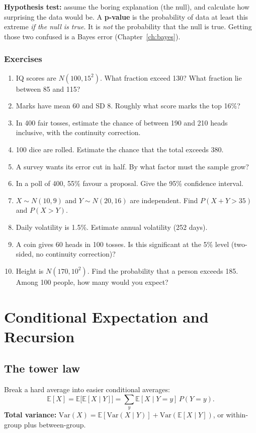 \documentclass[11pt,a4paper,openany]{report}
\newenvironment{exercises}{\subsection*{Exercises \thechapter}\begin{enumerate}[label=\textbf{\thechapter.\arabic*},leftmargin=3.2em]}{\end{enumerate}}
\newcommand{\E}{\mathbb{E}}
\begin{document}
\textbf{Hypothesis test:} assume the boring explanation (the null), and calculate how surprising the data would be. A \textbf{p-value} is the probability of data at least this extreme \emph{if the null is true}. It is \emph{not} the probability that the null is true. Getting those two confused is a Bayes error (Chapter~\ref{ch:bayes}).

\begin{exercises}
\item IQ scores are $N(100,15^2)$. What fraction exceed 130? What fraction lie between 85 and 115?
\item Marks have mean 60 and SD 8. Roughly what score marks the top 16\%?
\item In 400 fair tosses, estimate the chance of between 190 and 210 heads inclusive, with the continuity correction.
\item 100 dice are rolled. Estimate the chance that the total exceeds 380.
\item A survey wants its error cut in half. By what factor must the sample grow?
\item In a poll of 400, 55\% favour a proposal. Give the 95\% confidence interval.
\item $X\sim N(10,9)$ and $Y\sim N(20,16)$ are independent. Find $P(X+Y>35)$ and $P(X>Y)$.
\item Daily volatility is 1.5\%. Estimate annual volatility (252 days).
\item A coin gives 60 heads in 100 tosses. Is this significant at the 5\% level (two-sided, no continuity correction)?
\item Height is $N(170,10^2)$. Find the probability that a person exceeds 185. Among 100 people, how many would you expect?
\end{exercises}

\chapter{Conditional Expectation and Recursion}\label{ch:tower}

\section{The tower law}
\begin{idea}
Break a hard average into easier conditional averages:
\[\E[X]=\E\big[\E[X\mid Y]\big]=\sum_y\E[X\mid Y=y]\,P(Y=y).\]
\textbf{Total variance:} $\text{Var}(X)=\E[\text{Var}(X\mid Y)]+\text{Var}(\E[X\mid Y])$, or within-group plus between-group.
\end{idea}
\end{document}
